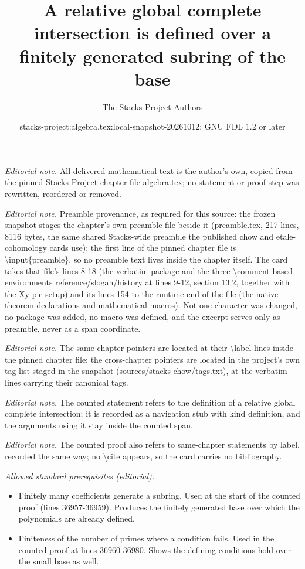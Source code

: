 \documentclass[10pt,a4paper]{amsart}
\title{A relative global complete intersection is defined over a finitely generated subring of the base}
\author{The Stacks Project Authors}
\date{stacks-project:algebra.tex:local-snapshot-20261012; GNU FDL 1.2 or later}
\theoremstyle{plain}
\theoremstyle{definition}
\theoremstyle{remark}
\numberwithin{equation}{subsection}
\begin{document}
\maketitle
\noindent\textit{Editorial note.} All delivered mathematical text is the author's own, copied from the pinned Stacks Project chapter file algebra.tex; no statement or proof step was rewritten, reordered or removed.\par\medskip
\noindent\textit{Editorial note.} Preamble provenance, as required for this source: the frozen snapshot stages the chapter's own preamble file beside it (preamble.tex, 217 lines, 8116 bytes, the same shared Stacks-wide preamble the published chow and etale-cohomology cards use); the first line of the pinned chapter file is \textbackslash{}input\{preamble\}, so no preamble text lives inside the chapter itself. The card takes that file's lines 8-18 (the verbatim package and the three \textbackslash{}comment-based environments reference/slogan/history at lines 9-12, section 13.2, together with the Xy-pic setup) and its lines 154 to the runtime end of the file (the native theorem declarations and mathematical macros). Not one character was changed, no package was added, no macro was defined, and the excerpt serves only as preamble, never as a span coordinate.\par\medskip
\noindent\textit{Editorial note.} The same-chapter pointers are located at their \textbackslash{}label lines inside the pinned chapter file; the cross-chapter pointers are located in the project's own tag list staged in the snapshot (sources/stacks-chow/tags.txt), at the verbatim lines carrying their canonical tags.\par\medskip
\noindent\textit{Editorial note.} The counted statement refers to the definition of a relative global complete intersection; it is recorded as a navigation stub with kind definition, and the arguments using it stay inside the counted span.\par\medskip
\noindent\textit{Editorial note.} The counted proof also refers to same-chapter statements by label, recorded the same way; no \textbackslash{}cite appears, so the card carries no bibliography.\par\medskip
\noindent\textit{Allowed standard prerequisites (editorial).}\begin{itemize}
\item Finitely many coefficients generate a subring. Used at the start of the counted proof (lines 36957-36959). Produces the finitely generated base over which the polynomials are already defined.
\item Finiteness of the number of primes where a condition fails. Used in the counted proof at lines 36960-36980. Shows the defining conditions hold over the small base as well.
\end{itemize}\medskip
\end{document}
